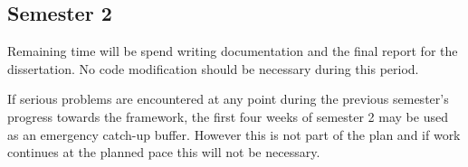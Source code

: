 \subsection{Semester 2}
Remaining time will be spend writing documentation and the final report for the dissertation. No code modification should be necessary during this period.

If serious problems are encountered at any point during the previous semester's progress towards the framework, the first four weeks of semester 2 may be used as an emergency catch-up buffer. However this is not part of the plan and if work continues at the planned pace this will not be necessary.
